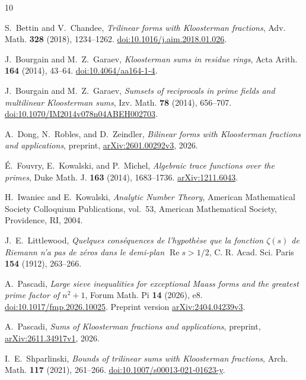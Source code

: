 \documentclass[11pt]{amsart}
\numberwithin{equation}{section}
\theoremstyle{remark}
\begin{document}
\begin{thebibliography}{10}
\raggedright

S.~Bettin and V.~Chandee,
\emph{Trilinear forms with Kloosterman fractions},
Adv. Math. \textbf{328} (2018), 1234--1262.
\href{https://doi.org/10.1016/j.aim.2018.01.026}{doi:10.1016/j.aim.2018.01.026}.

J.~Bourgain and M.~Z.~Garaev,
\emph{Kloosterman sums in residue rings},
Acta Arith. \textbf{164} (2014), 43--64.
\href{https://doi.org/10.4064/aa164-1-4}{doi:10.4064/aa164-1-4}.

J.~Bourgain and M.~Z.~Garaev,
\emph{Sumsets of reciprocals in prime fields and multilinear Kloosterman sums},
Izv. Math. \textbf{78} (2014), 656--707.
\href{https://doi.org/10.1070/IM2014v078n04ABEH002703}{doi:10.1070/IM2014v078n04ABEH002703}.

A.~Dong, N.~Robles, and D.~Zeindler,
\emph{Bilinear forms with Kloosterman fractions and applications},
preprint, \href{https://arxiv.org/abs/2601.00292v3}{arXiv:2601.00292v3}, 2026.

\'E.~Fouvry, E.~Kowalski, and P.~Michel,
\emph{Algebraic trace functions over the primes},
Duke Math. J. \textbf{163} (2014), 1683--1736.
\href{https://arxiv.org/abs/1211.6043}{arXiv:1211.6043}.

H.~Iwaniec and E.~Kowalski,
\emph{Analytic Number Theory},
American Mathematical Society Colloquium Publications, vol.~53,
American Mathematical Society, Providence, RI, 2004.

J.~E.~Littlewood,
\emph{Quelques cons\'equences de l'hypoth\`ese que la fonction
\(\zeta(s)\) de Riemann n'a pas de z\'eros dans le demi-plan
\(\operatorname{Re}s>1/2\)},
C. R. Acad. Sci. Paris \textbf{154} (1912), 263--266.

A.~Pascadi,
\emph{Large sieve inequalities for exceptional Maass forms and the
greatest prime factor of \(n^2+1\)},
Forum Math. Pi \textbf{14} (2026), e8.
\href{https://doi.org/10.1017/fmp.2026.10025}{doi:10.1017/fmp.2026.10025}.
Preprint version \href{https://arxiv.org/abs/2404.04239v3}{arXiv:2404.04239v3}.

A.~Pascadi,
\emph{Sums of Kloosterman fractions and applications},
preprint, \href{https://arxiv.org/abs/2611.34917v1}{arXiv:2611.34917v1}, 2026.

I.~E.~Shparlinski,
\emph{Bounds of trilinear sums with Kloosterman fractions},
Arch. Math. \textbf{117} (2021), 261--266.
\href{https://doi.org/10.1007/s00013-021-01623-y}{doi:10.1007/s00013-021-01623-y}.

\end{thebibliography}
\end{document}
